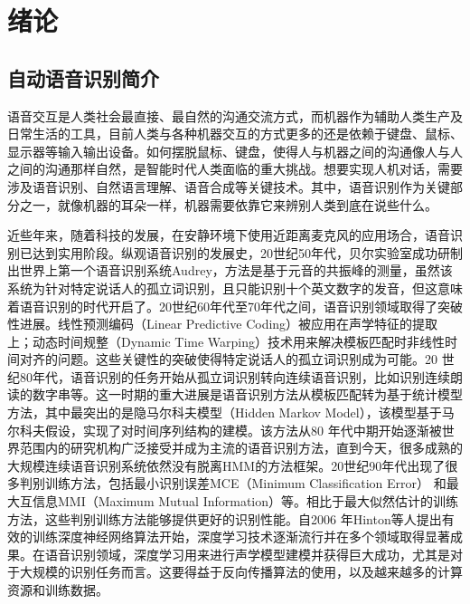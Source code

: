\chapter{绪论}

\section{自动语音识别简介}
语音交互是人类社会最直接、最自然的沟通交流方式，而机器作为辅助人类生产及日常生活的工具，目前人类与各种机器交互的方式更多的还是依赖于键盘、鼠标、显示器等输入输出设备。如何摆脱鼠标、键盘，使得人与机器之间的沟通像人与人之间的沟通那样自然，是智能时代人类面临的重大挑战。想要实现人机对话，需要涉及语音识别、自然语言理解、语音合成等关键技术。其中，语音识别作为关键部分之一，就像机器的耳朵一样，机器需要依靠它来辨别人类到底在说些什么。

近些年来，随着科技的发展，在安静环境下使用近距离麦克风的应用场合，语音识别已达到实用阶段。纵观语音识别的发展史，20世纪50年代，贝尔实验室成功研制出世界上第一个语音识别系统Audrey\cite{pinola2011speech}，方法是基于元音的共振峰的测量，虽然该系统为针对特定说话人的孤立词识别，且只能识别十个英文数字的发音，但这意味着语音识别的时代开启了。20世纪60年代至70年代之间，语音识别领域取得了突破性进展。线性预测编码（Linear Predictive Coding）被应用在声学特征的提取上\cite{atal1970adaptive}；动态时间规整（Dynamic Time Warping）技术用来解决模板匹配时非线性时间对齐的问题\cite{velichko1970automatic}。这些关键性的突破使得特定说话人的孤立词识别成为可能。20 世纪80年代，语音识别的任务开始从孤立词识别转向连续语音识别，比如识别连续朗读的数字串等。这一时期的重大进展是语音识别方法从模板匹配转为基于统计模型方法，其中最突出的是隐马尔科夫模型（Hidden Markov Model）\cite{rabiner1989tutorial}，该模型基于马尔科夫假设，实现了对时间序列结构的建模。该方法从80 年代中期开始逐渐被世界范围内的研究机构广泛接受并成为主流的语音识别方法，直到今天，很多成熟的大规模连续语音识别系统依然没有脱离HMM的方法框架。20世纪90年代出现了很多判别训练方法，包括最小识别误差MCE（Minimum Classification Error）\cite{juang1997minimum} 和最大互信息MMI（Maximum Mutual Information）\cite{normandin1992hidden}等。相比于最大似然估计的训练方法，这些判别训练方法能够提供更好的识别性能。自2006 年Hinton等人提出有效的训练深度神经网络算法\cite{hinton2006fast}开始，深度学习技术逐渐流行并在多个领域取得显著成果。在语音识别领域，深度学习用来进行声学模型建模并获得巨大成功，尤其是对于大规模的识别任务而言\cite{dahl2012context}\cite{hinton2012deep}。这要得益于反向传播算法的使用，以及越来越多的计算资源和训练数据。
